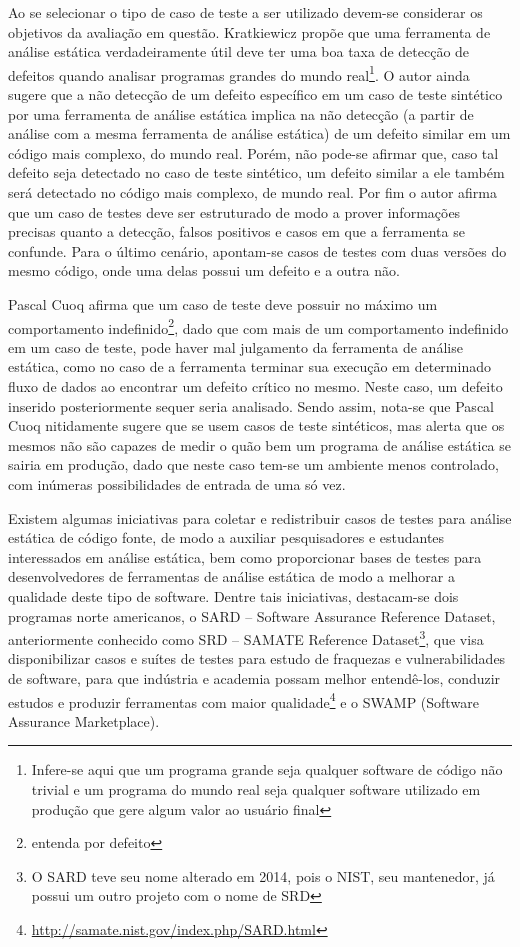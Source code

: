   Ao se selecionar o tipo de caso de teste a ser utilizado devem-se considerar os objetivos da avaliação em questão. Kratkiewicz \cite{harvard} propõe que uma ferramenta de análise estática verdadeiramente útil deve ter uma boa taxa de detecção de defeitos quando  analisar programas grandes do mundo real\footnote{Infere-se aqui que um programa grande seja qualquer software de código não trivial e um programa do mundo real seja qualquer software utilizado em produção que gere algum valor ao usuário final}. O autor ainda sugere que a não detecção de um defeito específico em um caso de teste sintético por uma ferramenta de análise estática implica na não detecção (a partir de análise com a mesma ferramenta de análise estática) de um defeito similar em um código mais complexo, do mundo real. Porém, não pode-se afirmar que, caso tal defeito seja detectado no caso de teste sintético, um defeito similar a ele também será detectado no código mais complexo, de mundo real. Por fim o autor afirma que um caso de testes deve ser estruturado de modo a prover informações precisas quanto a detecção, falsos positivos e casos em que a ferramenta se confunde. Para o último cenário, apontam-se casos de testes com duas versões do mesmo código, onde uma delas possui um defeito e a outra não.

  Pascal Cuoq \cite{pascal} afirma que um caso de teste deve possuir no máximo um comportamento indefinido\footnote{entenda por defeito}, dado que com mais de um comportamento indefinido em um caso de teste, pode haver mal julgamento da ferramenta de análise estática, como no caso de a ferramenta terminar sua execução em determinado fluxo de dados ao encontrar um defeito crítico no mesmo. Neste caso, um defeito inserido posteriormente sequer seria analisado. Sendo assim, nota-se que Pascal Cuoq nitidamente sugere que se usem casos de teste sintéticos, mas alerta que os mesmos não são capazes de medir o quão bem um programa de análise estática se sairia em produção, dado que neste caso tem-se um ambiente menos controlado, com inúmeras possibilidades de entrada de uma só vez.

  Existem algumas iniciativas para coletar e redistribuir casos de testes para análise estática de código fonte, de modo a auxiliar pesquisadores e estudantes interessados em análise estática, bem como proporcionar bases de testes para desenvolvedores de ferramentas de análise estática de modo a melhorar a qualidade deste tipo de software. Dentre tais iniciativas, destacam-se dois programas norte americanos, o SARD  – Software Assurance Reference Dataset, anteriormente conhecido como SRD – SAMATE Reference Dataset\footnote{O SARD teve seu nome alterado em 2014, pois o NIST, seu mantenedor, já possui um outro projeto com o nome de SRD}, que visa disponibilizar casos e suítes de testes para estudo de fraquezas e vulnerabilidades de software, para que indústria e academia possam melhor entendê-los, conduzir estudos e produzir ferramentas com maior qualidade\footnote{\url{http://samate.nist.gov/index.php/SARD.html}} e o SWAMP (Software Assurance Marketplace).

